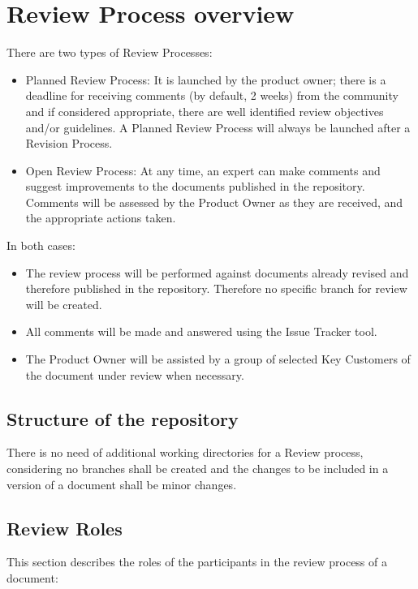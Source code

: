 \documentclass{template/openetcs_article}
\begin{document}
\section{Review Process overview}

There are two types of Review Processes:
\begin{itemize}
\item Planned Review Process: It is launched by the product owner; there is a deadline for receiving comments (by default, 2 weeks) from the community and if considered appropriate, there are well identified review objectives and/or guidelines. A Planned Review Process will always be launched after a Revision Process.
\item Open Review Process: At any time, an expert can make comments and suggest improvements to the documents published in the repository. Comments will be assessed by the Product Owner as they are received, and the appropriate actions taken.
\end{itemize}

In both cases:
\begin{itemize}
\item The review process will be performed against documents already revised and therefore published in the repository. Therefore no specific branch for review will be created.
\item All comments will be made and answered using the Issue Tracker tool.
\item The Product Owner will be assisted by a group of selected Key Customers of the document under review when necessary.
\end{itemize}

\subsection{Structure of the repository}
 
There is no need of additional working directories for a Review process, considering no branches shall be created and the changes to be included in a version of a document shall be minor changes.

\subsection{Review Roles}

This section describes the roles of the participants in the review process of a document:
\end{document}
